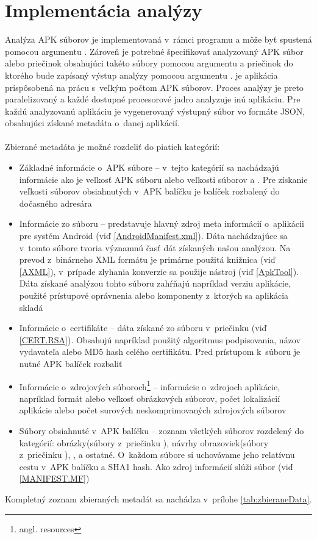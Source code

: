 \section{Implementácia analýzy}
Analýza APK súborov je implementovaná v~rámci programu  a môže byť spustená pomocou argumentu . Zároveň je potrebné špecifikovať analyzovaný APK súbor alebo priečinok obsahujúci takéto súbory pomocou argumentu  a priečinok do ktorého bude zapísaný výstup analýzy pomocou argumentu .  je aplikácia prispôsobená na prácu s~veľkým počtom APK súborov. Proces analýzy je preto paralelizovaný a každé dostupné procesorové jadro analyzuje inú aplikáciu. Pre každú analyzovanú aplikáciu je vygenerovaný výstupný súbor vo formáte JSON, obsahujúci získané metadáta o~danej aplikácií. \\\\
Zbierané metadáta je možné rozdeliť do piatich kategórií:
\begin{itemize}
\item Základné informácie o~APK súbore -- v~tejto kategórií sa nachádzajú informácie ako je veľkosť APK súboru alebo veľkosti súborov  a . Pre získanie veľkosti súborov obsiahnutých v~APK balíčku je balíček rozbalený do dočasného adresára
\item Informácie zo súboru  --  predstavuje hlavný zdroj meta informácií o~aplikácii pre systém Android (viď \ref{AndroidManifest.xml}). Dáta nachádzajúce sa v~tomto súbore tvoria významnú časť dát získaných našou analýzou. Na prevod z~binárneho XML formátu je primárne použitá knižnica  (viď \ref{AXML}), v~prípade zlyhania konverzie sa použije  nástroj  (viď \ref{ApkTool}). Dáta získané analýzou tohto súboru zahŕňajú napríklad verziu aplikácie, použité prístupové oprávnenia alebo komponenty z~ktorých sa aplikácia skladá
\item Informácie o~certifikáte -- dáta získané zo súboru  v~priečinku  (viď \ref{CERT.RSA}). Obsahujú napríklad použitý algoritmus podpisovania, názov vydavateľa alebo MD5 hash celého certifikátu. Pred prístupom k~súboru  je nutné APK balíček rozbaliť
\item Informácie o~zdrojových súboroch\footnote{angl. resources} -- informácie o~zdrojoch aplikácie, napríklad formát alebo veľkosť obrázkových súborov, počet lokalizácií aplikácie alebo počet surových neskomprimovaných zdrojových súborov
\item Súbory obsiahnuté v~APK balíčku -- zoznam všetkých súborov rozdelený do kategórií: obrázky(súbory z~priečinku ), návrhy obrazoviek(súbory z~priečinku ), ,  a ostatné. O~každom súbore si uchovávame jeho relatívnu cestu v~APK balíčku a SHA1 hash. Ako zdroj informácií slúži súbor  (viď \ref{MANIFEST.MF})
\end{itemize}

\noindent Kompletný zoznam zbieraných metadát sa nachádza v~prílohe \ref{tab:zbieraneData}.